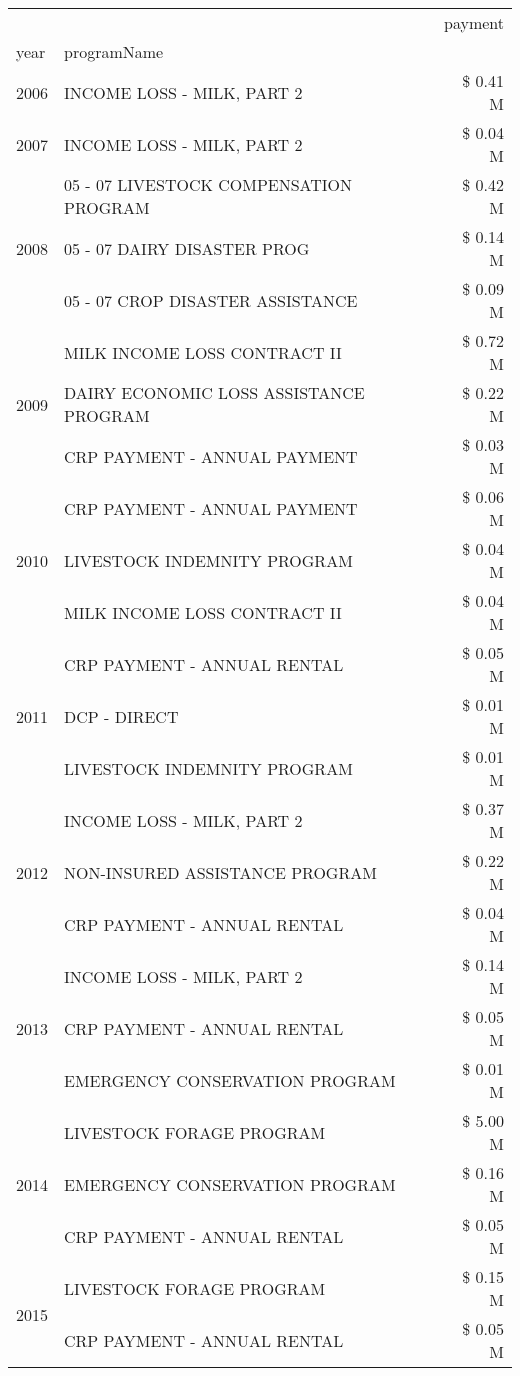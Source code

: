 \begin{tabular}{llr}
\toprule
 &  & payment \\
year & programName &  \\
\midrule
2006 & INCOME LOSS - MILK, PART 2 & \$ 0.41 M \\
\cline{1-3}
2007 & INCOME LOSS - MILK, PART 2 & \$ 0.04 M \\
\cline{1-3}
\multirow[t]{3}{*}{2008} & 05 - 07 LIVESTOCK COMPENSATION PROGRAM & \$ 0.42 M \\
 & 05 - 07 DAIRY DISASTER PROG & \$ 0.14 M \\
 & 05 - 07 CROP DISASTER ASSISTANCE & \$ 0.09 M \\
\cline{1-3}
\multirow[t]{3}{*}{2009} & MILK INCOME LOSS CONTRACT II & \$ 0.72 M \\
 & DAIRY ECONOMIC LOSS ASSISTANCE PROGRAM & \$ 0.22 M \\
 & CRP PAYMENT - ANNUAL PAYMENT & \$ 0.03 M \\
\cline{1-3}
\multirow[t]{3}{*}{2010} & CRP PAYMENT - ANNUAL PAYMENT & \$ 0.06 M \\
 & LIVESTOCK INDEMNITY PROGRAM & \$ 0.04 M \\
 & MILK INCOME LOSS CONTRACT II & \$ 0.04 M \\
\cline{1-3}
\multirow[t]{3}{*}{2011} & CRP PAYMENT - ANNUAL RENTAL & \$ 0.05 M \\
 & DCP - DIRECT & \$ 0.01 M \\
 & LIVESTOCK INDEMNITY PROGRAM & \$ 0.01 M \\
\cline{1-3}
\multirow[t]{3}{*}{2012} & INCOME LOSS - MILK, PART 2 & \$ 0.37 M \\
 & NON-INSURED ASSISTANCE PROGRAM & \$ 0.22 M \\
 & CRP PAYMENT - ANNUAL RENTAL & \$ 0.04 M \\
\cline{1-3}
\multirow[t]{3}{*}{2013} & INCOME LOSS - MILK, PART 2 & \$ 0.14 M \\
 & CRP PAYMENT - ANNUAL RENTAL & \$ 0.05 M \\
 & EMERGENCY CONSERVATION PROGRAM & \$ 0.01 M \\
\cline{1-3}
\multirow[t]{3}{*}{2014} & LIVESTOCK FORAGE PROGRAM & \$ 5.00 M \\
 & EMERGENCY CONSERVATION PROGRAM & \$ 0.16 M \\
 & CRP PAYMENT - ANNUAL RENTAL & \$ 0.05 M \\
\cline{1-3}
\multirow[t]{3}{*}{2015} & LIVESTOCK FORAGE PROGRAM & \$ 0.15 M \\
 & CRP PAYMENT - ANNUAL RENTAL & \$ 0.05 M \\

\end{tabular}
